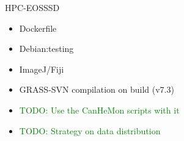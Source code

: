 \documentclass[serif,mathserif,aspectratio=169]{beamer}
\begin{document}


{
\begin{frame}[plain]
\begin{shaded}
\Huge HPC-EOSSSD
\end{shaded}
\end{frame}}


\begin{frame}
\begin{center}
\begin{itemize}
 \item Dockerfile
 \item Debian:testing
 \item ImageJ/Fiji
 \item GRASS-SVN compilation on build (v7.3)
 \item \textcolor{green}{TODO: Use the CanHeMon scripts with it}
 \item \textcolor{green}{TODO: Strategy on data distribution}
\end{itemize}
\end{center}
\end{frame}

\end{document}
